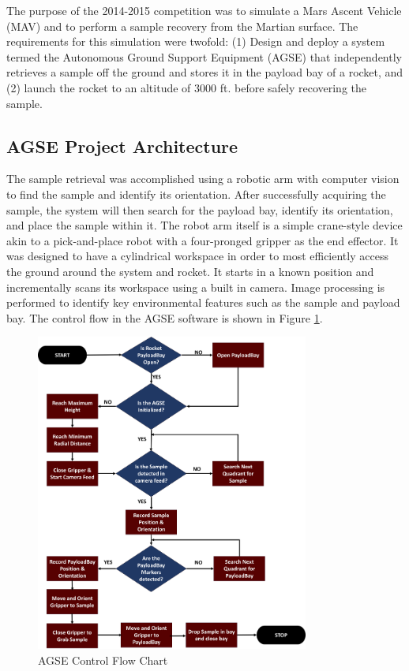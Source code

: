 The purpose of the 2014-2015 competition was to simulate a Mars Ascent
Vehicle (MAV) and to perform a sample recovery from the Martian
surface. The requirements for this simulation were twofold: (1) Design
and deploy a system termed the Autonomous Ground Support Equipment
(AGSE) that independently retrieves a sample off the ground and stores
it in the payload bay of a rocket, and (2) launch the rocket to an
altitude of 3000 ft. before safely recovering the sample.


\subsection{AGSE Project Architecture}

The sample retrieval was accomplished using a robotic arm with
computer vision to find the sample and identify its orientation. After
successfully acquiring the sample, the system will then search for the
payload bay, identify its orientation, and place the sample within it.
The robot arm itself is a simple crane-style device akin to a
pick-and-place robot with a four-pronged gripper as the end effector.
It was designed to have a cylindrical workspace in order to most
efficiently access the ground around the system and rocket. It starts
in a known position and incrementally scans its workspace using a
built in camera. Image processing is performed to identify key
environmental features such as the sample and payload bay.  The
control flow in the AGSE software is shown in Figure
\ref{fig:AGSE-FlowChart}.

\begin{figure}[h]
	\centering
        \includegraphics[width=0.8\textwidth]{Figures/AGSE-FlowChart.png}
	\caption{AGSE Control Flow Chart}
	\label{fig:AGSE-FlowChart}
\end{figure}

